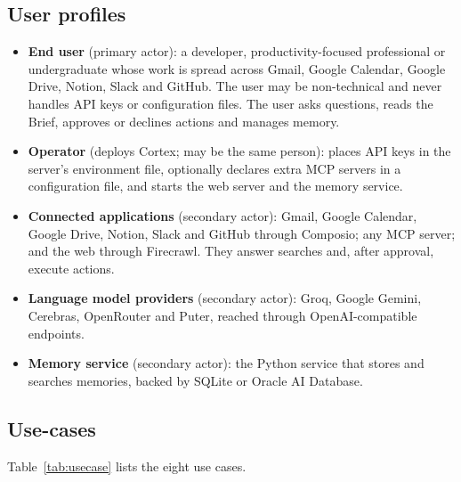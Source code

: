 \documentclass[oneside,a4paper,12pt]{report}
\begin{document}
 \subsection{User profiles}
\begin{itemize}
\item \textbf{End user} (primary actor): a developer, productivity-focused professional or undergraduate whose work is spread across Gmail, Google Calendar, Google Drive, Notion, Slack and GitHub. The user may be non-technical and never handles API keys or configuration files. The user asks questions, reads the Brief, approves or declines actions and manages memory.
\item \textbf{Operator} (deploys Cortex; may be the same person): places API keys in the server's environment file, optionally declares extra MCP servers in a configuration file, and starts the web server and the memory service.
\item \textbf{Connected applications} (secondary actor): Gmail, Google Calendar, Google Drive, Notion, Slack and GitHub through Composio; any MCP server; and the web through Firecrawl. They answer searches and, after approval, execute actions.
\item \textbf{Language model providers} (secondary actor): Groq, Google Gemini, Cerebras, OpenRouter and Puter, reached through OpenAI-compatible endpoints.
\item \textbf{Memory service} (secondary actor): the Python service that stores and searches memories, backed by SQLite or Oracle AI Database.
\end{itemize}

\subsection{Use-cases}
Table~\ref{tab:usecase} lists the eight use cases.
\end{document}
